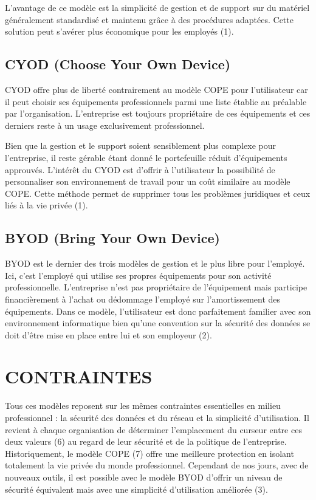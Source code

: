 \documentclass[letterpaper, 11 pt, conference]{ieeeconf}
\begin{document}
L'avantage de ce mod\`{e}le est la simplicit\'{e} de gestion et de support sur du mat\'{e}riel g\'{e}n\'{e}ralement standardis\'{e} et maintenu gr\^{a}ce \`{a} des proc\'{e}dures adapt\'{e}es. Cette solution peut s'av\'{e}rer plus \'{e}conomique pour les employ\'{e}s (1). 
\linebreak

\subsection{CYOD (Choose Your Own Device)}
CYOD offre plus de libert\'{e} contrairement au mod\`{e}le COPE pour l'utilisateur car il peut choisir ses \'{e}quipements professionnels parmi une liste \'{e}tablie au pr\'{e}alable par l'organisation. L'entreprise est toujours propri\'{e}taire de ces \'{e}quipements et ces derniers reste \`{a} un usage exclusivement professionnel. 

Bien que la gestion et le support soient sensiblement plus complexe pour l'entreprise, il reste g\'{e}rable \'{e}tant donn\'{e} le portefeuille r\'{e}duit d’\'{e}quipements approuv\'{e}s. L'int\'{e}r\^{e}t du CYOD est d'offrir \`{a} l'utilisateur la possibilit\'{e} de personnaliser son environnement de travail pour un co\^{u}t similaire au mod\`{e}le COPE. Cette m\'{e}thode permet de supprimer tous les probl\`{e}mes juridiques et ceux li\'{e}s \`{a} la vie priv\'{e}e (1).
\linebreak

\subsection{BYOD (Bring Your Own Device)}
BYOD est le dernier des trois mod\`{e}les de gestion et le plus libre pour l'employ\'{e}. Ici, c’est l'employ\'{e} qui utilise ses propres \'{e}quipements pour son activit\'{e} professionnelle. L'entreprise n'est pas propri\'{e}taire de l'\'{e}quipement mais participe financi\`{e}rement \`{a} l'achat ou d\'{e}dommage l’employ\'{e} sur l'amortissement des \'{e}quipements. Dans ce mod\`{e}le, l'utilisateur est donc parfaitement familier avec son environnement informatique bien qu’une convention sur la s\'{e}curit\'{e} des donn\'{e}es se doit d’\^{e}tre mise en place entre lui et son employeur (2).
\linebreak

\section{CONTRAINTES}
Tous ces mod\`{e}les reposent sur les m\^{e}mes contraintes essentielles en milieu professionnel : la s\'{e}curit\'{e} des donn\'{e}es et du r\'{e}seau et la simplicit\'{e} d’utilisation. Il revient \`{a} chaque organisation de d\'{e}terminer l’emplacement du curseur entre ces deux valeurs (6) au regard de leur s\'{e}curit\'{e} et de la politique de l’entreprise. Historiquement, le mod\`{e}le COPE (7) offre une meilleure protection en isolant totalement la vie priv\'{e}e du monde professionnel. Cependant de nos jours, avec de nouveaux outils, il est possible avec le mod\`{e}le BYOD d’offrir un niveau de s\'{e}curit\'{e} \'{e}quivalent mais avec une simplicit\'{e} d’utilisation am\'{e}lior\'{e}e (3).
\end{document}
